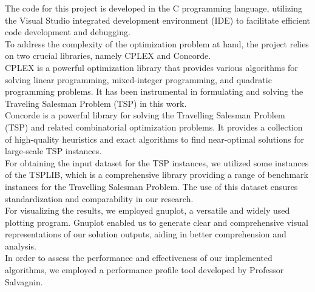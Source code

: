 The code for this project is developed in the C programming language, utilizing the Visual Studio integrated development environment (IDE) to facilitate efficient code development and debugging.
\\To address the complexity of the optimization problem at hand, the project relies on two crucial libraries, namely CPLEX \cite{CPLEX} and Concorde. \\CPLEX is a powerful optimization library that provides various algorithms for solving linear programming, mixed-integer programming, and quadratic programming problems. It has been instrumental in formulating and solving the Traveling Salesman Problem (TSP) in this work.
\\
Concorde is a powerful library for solving the Travelling Salesman Problem (TSP) and related combinatorial optimization problems. It provides a collection of high-quality heuristics and exact algorithms to find near-optimal solutions for large-scale TSP instances. 
\\
For obtaining the input dataset for the TSP instances, we utilized some instances of the TSPLIB, which is a comprehensive library providing a range of benchmark instances for the Travelling Salesman Problem. The use of this dataset ensures standardization and comparability in our research.
\\
For visualizing the results, we employed gnuplot, a versatile and widely used plotting program. Gnuplot enabled us to generate clear and comprehensive visual representations of our solution outputs, aiding in better comprehension and analysis.
\\
In order to assess the performance and effectiveness of our implemented algorithms, we employed a performance profile tool developed by Professor Salvagnin.
